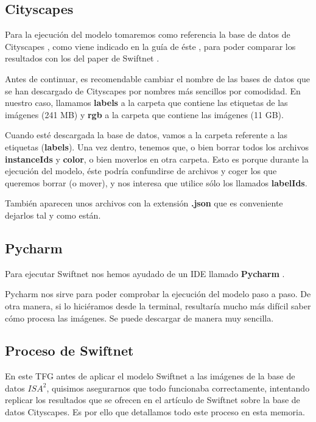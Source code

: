 \subsection{Cityscapes}

Para la ejecución del modelo tomaremos como referencia la base de datos de Cityscapes \cite{cityscapes}, como viene indicado en la guía de éste \cite{github_swiftnet}, para poder comparar los resultados con los del paper de Swiftnet \cite{swiftnet}.

Antes de continuar, es recomendable cambiar el nombre de las bases de datos que se han descargado de Cityscapes por nombres más sencillos por comodidad. En nuestro caso, llamamos \textbf{labels} a la carpeta que contiene las etiquetas de las imágenes (241 MB) y \textbf{rgb} a la carpeta que contiene las imágenes (11 GB).

Cuando esté descargada la base de datos, vamos a la carpeta referente a las etiquetas (\textbf{labels}). Una vez dentro, tenemos que, o bien borrar todos los archivos \textbf{instanceIds} y \textbf{color}, o bien moverlos en otra carpeta. Esto es porque durante la ejecución del modelo, éste podría confundirse de archivos y coger los que queremos borrar (o mover), y nos interesa que utilice sólo los llamados \textbf{labelIds}.

También aparecen unos archivos con la extensión \textbf{.json} que es conveniente dejarlos tal y como están.

\subsection{Pycharm}

Para ejecutar Swiftnet nos hemos ayudado de un \ac{IDE} llamado \textbf{Pycharm} \cite{pycharm}.

Pycharm nos sirve para poder comprobar la ejecución del modelo paso a paso. De otra manera, si lo hiciéramos desde la terminal, resultaría mucho más difícil saber cómo procesa las imágenes. Se puede descargar de manera muy sencilla.

\subsection{Proceso de Swiftnet}
En este TFG antes de aplicar el modelo Swiftnet a las imágenes de la base de datos $ISA^2$, quisimos asegurarnos que todo funcionaba correctamente, intentando replicar los resultados que se ofrecen en el artículo de Swiftnet \cite{xxxx} sobre la base de datos Cityscapes. Es por ello que detallamos todo este proceso en esta memoria.

